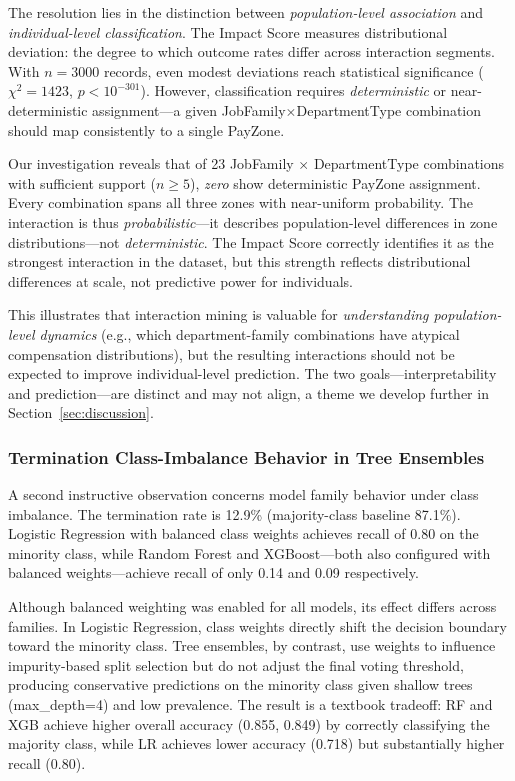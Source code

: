 \documentclass[conference]{IEEEtran}
\begin{document}
The resolution lies in the distinction between \textit{population-level association} and \textit{individual-level classification}. The Impact Score measures distributional deviation: the degree to which outcome rates differ across interaction segments. With $n=3000$ records, even modest deviations reach statistical significance ($\chi^2=1423$, $p<10^{-301}$). However, classification requires \textit{deterministic} or near-deterministic assignment---a given JobFamily$\times$DepartmentType combination should map consistently to a single PayZone.

Our investigation reveals that of 23 JobFamily $\times$ DepartmentType combinations with sufficient support ($n \geq 5$), \textit{zero} show deterministic PayZone assignment. Every combination spans all three zones with near-uniform probability. The interaction is thus \textit{probabilistic}---it describes population-level differences in zone distributions---not \textit{deterministic}. The Impact Score correctly identifies it as the strongest interaction in the dataset, but this strength reflects distributional differences at scale, not predictive power for individuals.

This illustrates that interaction mining is valuable for \textit{understanding population-level dynamics} (e.g., which department-family combinations have atypical compensation distributions), but the resulting interactions should not be expected to improve individual-level prediction. The two goals---interpretability and prediction---are distinct and may not align, a theme we develop further in Section~\ref{sec:discussion}.

\subsubsection{Termination Class-Imbalance Behavior in Tree Ensembles}

A second instructive observation concerns model family behavior under class imbalance. The termination rate is 12.9\% (majority-class baseline 87.1\%). Logistic Regression with balanced class weights achieves recall of 0.80 on the minority class, while Random Forest and XGBoost---both also configured with balanced weights---achieve recall of only 0.14 and 0.09 respectively.

Although balanced weighting was enabled for all models, its effect differs across families. In Logistic Regression, class weights directly shift the decision boundary toward the minority class. Tree ensembles, by contrast, use weights to influence impurity-based split selection but do not adjust the final voting threshold, producing conservative predictions on the minority class given shallow trees (max\_depth=4) and low prevalence. The result is a textbook tradeoff: RF and XGB achieve higher overall accuracy (0.855, 0.849) by correctly classifying the majority class, while LR achieves lower accuracy (0.718) but substantially higher recall (0.80).
\end{document}
